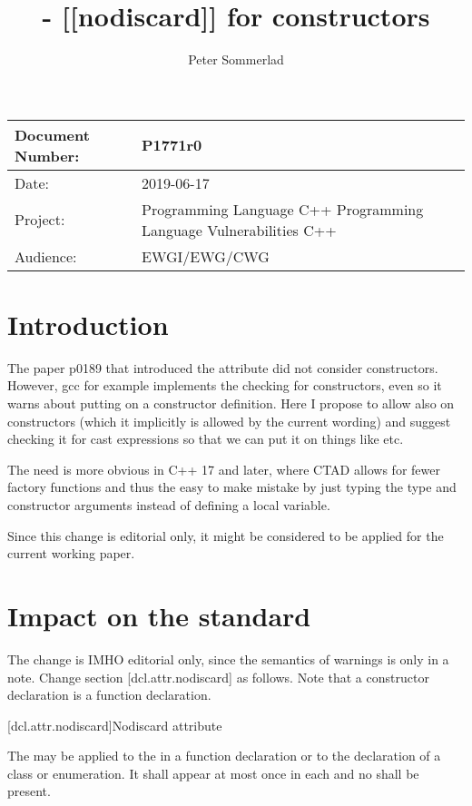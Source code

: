 \documentclass[ebook,11pt,article]{memoir}
\title{\papernumber{} - [[nodiscard]] for constructors}
\author{Peter Sommerlad}
\date{\paperdate}                %
\newcommand{\papernumber}{P1771r0}
\newcommand{\paperdate}{2019-06-17}
\begin{document}
\maketitle
\begin{center}
\begin{tabular}[t]{|l|p{8cm}|}\hline 
Document Number:&  \papernumber \\\hline
Date: & \paperdate \\\hline
Project: & Programming Language C++ \newline Programming Language Vulnerabilities C++\\\hline 
Audience: & EWGI/EWG/CWG\\\hline
\end{tabular}
\end{center}


\chapter{Introduction}

The  paper p0189 that introduced the \tcode{[[nodiscard]]} attribute did not consider constructors. However, gcc for example implements the checking for constructors, even so it warns about putting \tcode{[[nodiscard]]} on a constructor definition. Here I propose to allow  \tcode{[[nodiscard]]} also on constructors (which it implicitly is allowed by the current wording) and suggest checking it for cast expressions so that we can put it on things like  etc.

The need is more obvious in C++ 17 and later, where CTAD allows for fewer factory functions and thus the easy to make mistake by just typing the type and constructor arguments instead of defining a local variable.

Since this change is editorial only, it might be considered to be applied for the current working paper.

\chapter{Impact on the standard}

The change is IMHO editorial only, since the semantics of warnings is only in a note. Change section [dcl.attr.nodiscard] as follows. Note that a constructor declaration is a function declaration.

[dcl.attr.nodiscard]{Nodiscard attribute}%

\pnum
The  
may be applied to the 
in a function declaration or to the declaration of a class or enumeration.
It shall appear at most once in each  and
no  shall be present.
\end{document}
